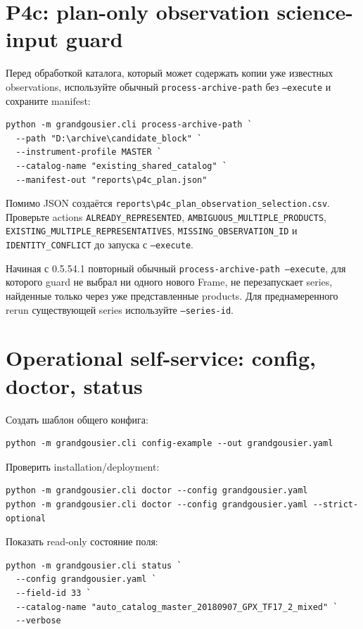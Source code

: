 \section{P4c: plan-only observation science-input guard}

Перед обработкой каталога, который может содержать копии уже известных observations, используйте обычный \texttt{process-archive-path} без \texttt{--execute} и сохраните manifest:

\begin{lstlisting}
python -m grandgousier.cli process-archive-path `
  --path "D:\archive\candidate_block" `
  --instrument-profile MASTER `
  --catalog-name "existing_shared_catalog" `
  --manifest-out "reports\p4c_plan.json"
\end{lstlisting}

Помимо JSON создаётся \texttt{reports\textbackslash p4c\_plan\_observation\_selection.csv}. Проверьте actions \texttt{ALREADY\_REPRESENTED}, \texttt{AMBIGUOUS\_MULTIPLE\_PRODUCTS}, \texttt{EXISTING\_MULTIPLE\_REPRESENTATIVES}, \texttt{MISSING\_OBSERVATION\_ID} и \texttt{IDENTITY\_CONFLICT} до запуска с \texttt{--execute}.

Начиная с 0.5.54.1 повторный обычный \texttt{process-archive-path --execute}, для которого guard не выбрал ни одного нового Frame, не перезапускает series, найденные только через уже представленные products. Для преднамеренного rerun существующей series используйте \texttt{--series-id}.


\section{Operational self-service: config, doctor, status}

Создать шаблон общего конфига:
\begin{lstlisting}
python -m grandgousier.cli config-example --out grandgousier.yaml
\end{lstlisting}

Проверить installation/deployment:
\begin{lstlisting}
python -m grandgousier.cli doctor --config grandgousier.yaml
python -m grandgousier.cli doctor --config grandgousier.yaml --strict-optional
\end{lstlisting}

Показать read-only состояние поля:
\begin{lstlisting}
python -m grandgousier.cli status `
  --config grandgousier.yaml `
  --field-id 33 `
  --catalog-name "auto_catalog_master_20180907_GPX_TF17_2_mixed" `
  --verbose
\end{lstlisting}

